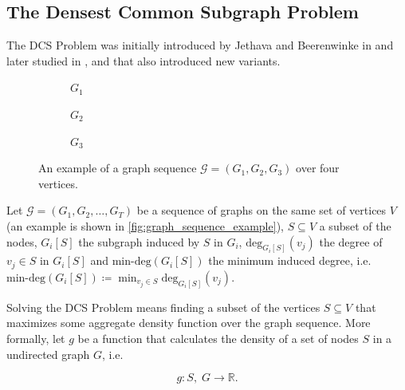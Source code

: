 \subsection{The Densest Common Subgraph Problem}%
\label{sub:the_common_densest_subgraph_problem}

The \acrfull{DCS} Problem was initially introduced by Jethava and Beerenwinke
in \cite{jethava2015finding}
and later studied in \cite{andersson2016finding}, \cite{charikar2018finding}
and \cite{semertzidis2019finding} that also introduced new variants.

\begin{figure}
	\begin{center}
		\begin{subfigure}[b]{0.3\textwidth}
			\centering
			\caption{$G_1$}
			\label{fig:graph_sequence_example1}
		\end{subfigure}
		\begin{subfigure}[b]{0.3\textwidth}
			\centering
			\caption{$G_2$}
			\label{fig:graph_sequence_example2}
		\end{subfigure}
		\begin{subfigure}[b]{0.3\textwidth}
			\centering
			\caption{$G_3$}
			\label{fig:graph_sequence_example3}
		\end{subfigure}
	\end{center}
	\caption[Example sequence graph]{An example of a graph sequence
		$\mathcal{G} = (G_1, G_2, G_3) $ over four vertices.}
	\label{fig:graph_sequence_example}
\end{figure}

Let $\mathcal{G} = (G_1, G_2, \dots, G_T) $ be a sequence of graphs on the same
set of vertices $V$ (an example is shown in
\autoref{fig:graph_sequence_example}), $S \subseteq V$ a
subset of the nodes, $G_i[S]$ the subgraph induced by $S$ in $G_i$,
$\text{deg}_{G_i[S]} (v_{j} )$ the degree of $v_{j} \in S$ in $G_i[S]$ and
$\text{min-deg}(G_i[S])$ the minimum induced degree, i.e.
$\text{min-deg}(G_i[S]) \coloneqq \min _{v_{j}  \in S} \text{deg} _{G_i[S]}
	(v_{j}) $.

Solving the \acrlong{DCS} Problem means finding a subset
of the vertices $S \subseteq V$ that maximizes some aggregate density function
over the graph sequence. More formally, let $g$ be a
function that calculates the density of a set of nodes $S$ in a undirected
graph $G$, i.e.\

\begin{equation*}
	g: S, \; G \rightarrow \mathbb{R}.
\end{equation*}

